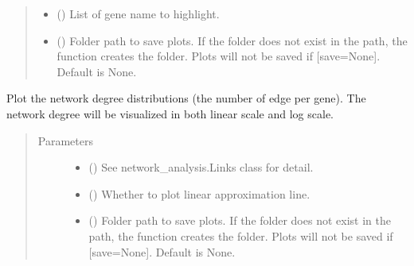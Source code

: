 \documentclass[letterpaper,10pt,english]{sphinxmanual}
\begin{document}
\begin{fulllineitems}
\begin{fulllineitems}
\begin{quote}
\begin{description}
\begin{itemize}
\item {} 
 () \textendash{} List of gene name to highlight.

\item {} 
 () \textendash{} Folder path to save plots. If the folder does not exist in the path, the function creates the folder.
Plots will not be saved if {[}save=None{]}. Default is None.

\end{itemize}

\end{description}\end{quote}

\end{fulllineitems}


\begin{fulllineitems}
\label{\detokenize{modules/celloracle:celloracle.Links.plot_degree_distributions}}
Plot the network degree distributions (the number of edge per gene).
The network degree will be visualized in both linear scale and log scale.
\begin{quote}\begin{description}
\item[{Parameters}] \leavevmode\begin{itemize}
\item {} 
 ({\hyperref[\detokenize{modules/celloracle:celloracle.Links}]{}}) \textendash{} See network\_analysis.Links class for detail.

\item {} 
 () \textendash{} Whether to plot linear approximation line.

\item {} 
 () \textendash{} Folder path to save plots. If the folder does not exist in the path, the function creates the folder.
Plots will not be saved if {[}save=None{]}. Default is None.


\end{itemize}
\end{description}
\end{quote}
\end{fulllineitems}
\end{fulllineitems}
\end{document}

